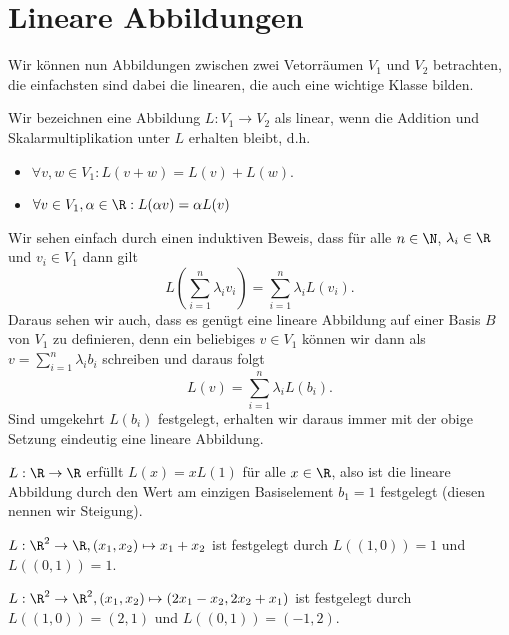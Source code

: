\documentclass[letterpaper,10pt,english]{jupyterBook}
\begin{document}
\section{Lineare Abbildungen}
\label{\detokenize{vektorraeume/LineareAbb:lineare-abbildungen}}\label{\detokenize{vektorraeume/LineareAbb::doc}}
Wir können nun Abbildungen zwischen zwei Vetorräumen \(V_1\) und \(V_2\) betrachten, die einfachsten sind dabei die linearen, die auch eine wichtige Klasse bilden.
\label{vektorraeume/LineareAbb:definition-0}
\begin{definition}{}{}



Wir bezeichnen eine Abbildung \(L: V_1 \rightarrow V_2\) als linear, wenn die Addition und Skalarmultiplikation unter \(L\) erhalten bleibt, d.h.
\begin{itemize}
\item {} 
\(\forall v,w \in V_1: L(v+w) = L(v) + L(w).\)

\item {} 
\(\forall v \in V_1, \alpha \in \R: L(\alpha v) = \alpha L(v)\)

\end{itemize}
\end{definition}

Wir sehen einfach durch einen induktiven Beweis, dass für alle \(n \in \N\), \(\lambda_i \in \R\) und \(v_i \in V_1\) dann gilt
\begin{equation*}
 L(\sum_{i=1}^n \lambda_i v_i) = \sum_{i=1}^n \lambda_i L(v_i) .
\end{equation*}
Daraus sehen wir auch, dass es genügt eine lineare Abbildung auf einer Basis \(B\) von \(V_1\) zu definieren, denn ein beliebiges \(v \in V_1\) können wir dann als \(v= \sum_{i=1}^n \lambda_i b_i\) schreiben und daraus folgt
\begin{equation*}
 L(v) = \sum_{i=1}^n \lambda_i L(b_i).
\end{equation*}
Sind umgekehrt \(L(b_i)\) festgelegt, erhalten wir daraus immer mit der obige Setzung eindeutig eine lineare Abbildung.
\label{vektorraeume/LineareAbb:example-1}
\begin{example}{}{}



\(L: \R \rightarrow \R\) erfüllt \(L(x) = x L(1)\) für alle \(x \in \R\), also ist die lineare Abbildung durch den Wert am einzigen Basiselement \(b_1=1\) festgelegt (diesen nennen wir Steigung).
\end{example}
\label{vektorraeume/LineareAbb:example-2}
\begin{example}{}{}



\(L: \R^2 \rightarrow \R, (x_1,x_2) \mapsto x_1 +x_2\) ist festgelegt durch \(L((1,0)) = 1\) und \(L((0,1))=1\).
\end{example}
\label{vektorraeume/LineareAbb:example-3}
\begin{example}{}{}



\(L: \R^2 \rightarrow \R^2, (x_1,x_2) \mapsto (2x_1-x_2,2x_2+x_1)\) ist festgelegt durch \(L((1,0)) = (2,1)\) und \(L((0,1))=(-1,2)\).
\end{example}
\end{document}
